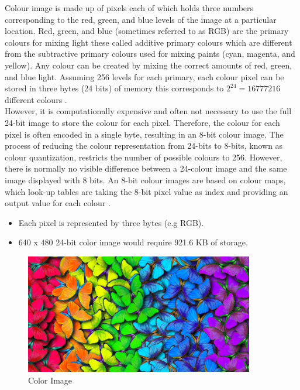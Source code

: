 Colour image is made up of pixels each of which holds three numbers corresponding to the red, green, and blue levels of the
image at a particular location. Red, green, and blue (sometimes referred to as RGB) are the primary colours for mixing
light these called additive primary colours which  are different from the subtractive primary colours used for mixing
paints (cyan, magenta, and yellow). Any colour can be created by mixing the correct amounts of red, green, and blue light.
Assuming 256 levels for each primary, each colour pixel can be stored in three bytes (24 bits) of memory this corresponds 
to $2^{24}=16777216$ different colours \cite{1.4}.\\
However, it is computationally expensive and often not necessary to use the full 24-bit image to store the colour for each pixel.
Therefore, the colour for each pixel is often encoded in a single byte, resulting in an 8-bit colour image. The process of reducing
the colour representation from 24-bits to 8-bits, known as colour quantization, restricts the number of possible colours to 256.
However, there is normally no visible difference between a 24-colour image and the same image displayed with 8 bits. An 8-bit colour
images are based on colour maps, which look-up tables are taking the 8-bit pixel value as index and providing an output value for each colour \cite{1.5}.

        \begin{itemize}
                \item Each pixel is represented by three bytes (e.g RGB).
                \item 640 x 480 24-bit color image would require 921.6 KB of storage.
        \end{itemize}

        \vspace{4cm}

        \begin{figure}[h]
                \centering
                \includegraphics[width=10cm]{chapiter1/figures/color-image.jpg}
                \setlength{\fboxrule}{2pt}
                \caption{Color Image}
                \label{fig:figure1.4}
        \end{figure}



